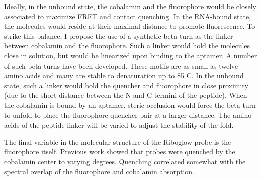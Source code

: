Ideally, in the unbound state, the cobalamin and the fluorophore would be closely associated to maximize FRET and contact quenching.\cite{LeeDesignSynthesisCharacterization2009} In the RNA-bound state, the molecules would reside at their maximal distance to promote fluorescence. To strike this balance, I propose the use of a synthetic beta turn as the linker between cobalamin and the fluorophore. Such a linker would hold the molecules close in solution, but would be linearized upon binding to the aptamer. A number of such beta turns have been developed. These motifs are as small as twelve amino acids and many are stable to denaturation up to 85 C.\cite{KierProbingLowerSize2008} In the unbound state, such a linker would hold the quencher and fluorophore in close proximity (due to the short distance between the N and C termini of the peptide). When the cobalamin is bound by an aptamer, steric occlusion would force the beta turn to unfold to place the fluorophore-quencher pair at a larger distance. The amino acids of the peptide linker will be varied to adjust the stability of the fold.



The final variable in the molecular structure of the Riboglow probe is the fluorophore itself. Previous work showed that probes were quenched by the cobalamin center to varying degrees. Quenching correlated somewhat with the spectral overlap of the fluorophore and cobalamin absorption.

